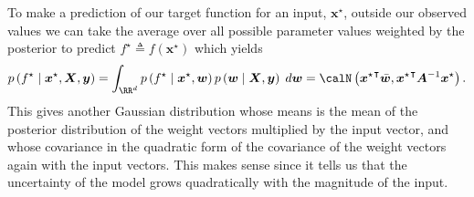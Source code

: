 To make a prediction of our target function for an input, $\bm{x}^{\star}$, outside our observed values we can take the average over all possible parameter values weighted by the posterior to predict $f^{\star} \triangleq f \left( \bm{x}^{\star} \right)$ which yields
\begin{equation*}
    p \left( f^{\star} \mid \bm{x}^{\star} , \bm{X} , \bm{y} \right) = \int_{\RR^d} p \left( f^{\star} \mid \bm{x}^{\star} , \bm{w} \right) p \left( \bm{w} \mid \bm{X} , \bm{y} \right) \; d \bm{w} = \calN \left( {\bm{x}^{\star}}^{\intercal} \bar{\bm{w}} , {\bm{x}^{\star}}^{\intercal} \bm{A}^{-1} \bm{x}^{\star} \right).
\end{equation*}
This gives another Gaussian distribution whose means is the mean of the posterior distribution of the weight vectors multiplied by the input vector, and whose covariance in the quadratic form of the covariance of the weight vectors again with the input vectors. This makes sense since it tells us that the uncertainty of the model grows quadratically with the magnitude of the input.

